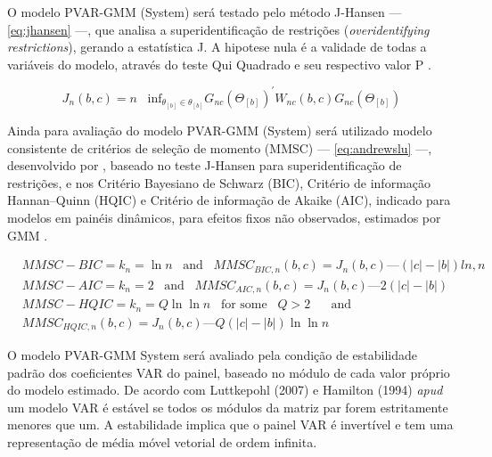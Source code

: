 \documentclass[
  12pt,
  12pt,
  openright,
  oneside,
  a4paper,
  chapter=TITLE,
  section=TITLE,
  subsection=TITLE,
  subsubsection=TITLE,
  portugues,
  sumario=tradicional]{abntex2}
\begin{document}
O modelo PVAR-GMM (System) será testado pelo método J-Hansen --- \autoref{eq:jhansen} ---, que analisa a superidentificação de restrições (\emph{overidentifying restrictions}), gerando a estatística J. A hipotese nula é a validade de todas a variáveis do modelo, através do teste Qui Quadrado e seu respectivo valor P \cite{andrews-lu:2001,sigmund:2008}.

\begin{equation}\label{eq:jhansen}
J_{n}(b,c) = n \hspace{10pt} \text{inf}_{\theta_{[b]} \in \theta_{[b]}} G_{nc} (\Theta_{[b]})^{'}W_{nc}(b,c)G_{nc}(\Theta_{[b]}) 
\end{equation}

Ainda para avaliação do modelo PVAR-GMM (System) será utilizado modelo consistente de critérios de seleção de momento (MMSC) --- \autoref{eq:andrewslu} ---, desenvolvido por \textcite{andrews-lu:2001}, baseado no teste J-Hansen para superidentificação de restrições, e nos Critério Bayesiano de Schwarz (BIC), Critério de informação Hannan--Quinn (HQIC) e Critério de informação de Akaike (AIC), indicado para modelos em painéis dinâmicos, para efeitos fixos não observados, estimados por GMM \cite{sigmund:2008, zivotwang:2003}.

\begin{equation}\label{eq:andrewslu}
\begin{aligned}{}
& MMSC-BIC = k_{n} = \ln n \hspace{10pt} \text{and} \hspace{10pt} MMSC_{BIC,n}(b,c) = J_{n}(b,c) — (|c| - |b| )ln,n \\
& MMSC-AIC = k_{n} = 2 \hspace{10pt} \text{and} \hspace{10pt} 
MMSC_{AIC,n}(b,c) = J_{n}(b,c) — 2(|c| - |b| ) \\
& MMSC-HQIC = k_{n} = Q \ln \ln n  \hspace{10pt} \text{for some} \hspace{10pt} Q > 2 \hspace{10pt} \hspace{10pt} \text{and} \hspace{10pt}  \\
& MMSC_{HQIC,n}(b,c) = J_{n}(b,c) — Q(|c| - |b|)\ln\ln n
\end{aligned}
\end{equation}

O modelo PVAR-GMM System será avaliado pela condição de estabilidade padrão dos coeficientes VAR do painel, baseado no módulo de cada valor próprio do modelo estimado. De acordo com Luttkepohl (2007) e Hamilton (1994) \emph{apud} \textcite{sigmund:2008} um modelo VAR é estável se todos os módulos da matriz par forem estritamente menores que um. A estabilidade implica que o painel VAR é invertível e tem uma representação de média móvel vetorial de ordem infinita.
\end{document}
